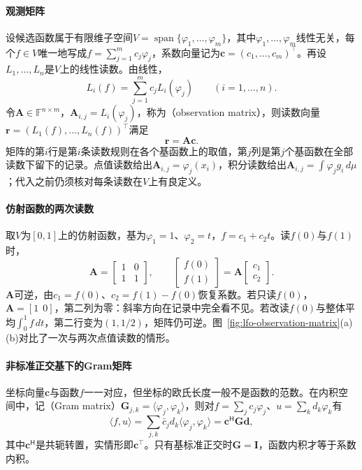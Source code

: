 \paragraph{观测矩阵}
设候选函数属于有限维子空间$V=\operatorname{span}\{\varphi_1,\ldots,\varphi_m\}$，其中$\varphi_1,\ldots,\varphi_m$线性无关，每个$f\in V$唯一地写成$f=\sum_{j=1}^mc_j\varphi_j$，系数向量记为$\bm c=(c_1,\ldots,c_m)^{\top}$。再设$L_1,\ldots,L_n$是$V$上的线性读数。由线性，
\[
 L_i(f)=\sum_{j=1}^mc_jL_i(\varphi_j)\qquad(i=1,\ldots,n).
\]
令$\bm A\in\mathbb F^{n\times m}$，$\bm A_{i,j}=L_i(\varphi_j)$，称为（observation matrix），则读数向量$\bm r=(L_1(f),\ldots,L_n(f))^{\top}$满足
\begin{equation}
 \bm r=\bm A\bm c .
 \label{eq:lfo-observation-matrix}
\end{equation}
矩阵的第$i$行是第$i$条读数规则在各个基函数上的取值，第$j$列是第$j$个基函数在全部读数下留下的记录。点值读数给出$\bm A_{i,j}=\varphi_j(x_i)$，积分读数给出$\bm A_{i,j}=\int\varphi_jg_i\,d\mu$；代入之前仍须核对每条读数在$V$上有良定义。

\paragraph{仿射函数的两次读数}
取$V$为$[0,1]$上的仿射函数，基为$\varphi_1=1$、$\varphi_2=t$，$f=c_1+c_2t$。读$f(0)$与$f(1)$时，
\[
 \bm A=\begin{bmatrix}1&0\\1&1\end{bmatrix},\qquad
 \begin{bmatrix}f(0)\\f(1)\end{bmatrix}=\bm A\begin{bmatrix}c_1\\c_2\end{bmatrix}.
\]
$\bm A$可逆，由$c_1=f(0)$、$c_2=f(1)-f(0)$恢复系数。若只读$f(0)$，$\bm A=[1\ \ 0]$，第二列为零：斜率方向在记录中完全看不见。若改读$f(0)$与整体平均$\int_0^1f\,dt$，第二行变为$(1,1/2)$，矩阵仍可逆。图~\ref{fig:lfo-observation-matrix}(a)(b)对比了一次与两次点值读数的情形。

\paragraph{非标准正交基下的Gram矩阵}
坐标向量$\bm c$与函数$f$一一对应，但坐标的欧氏长度一般不是函数的范数。在内积空间中，记（Gram matrix）$\bm G_{j,k}=\langle\varphi_j,\varphi_k\rangle$，则对$f=\sum_jc_j\varphi_j$、$u=\sum_kd_k\varphi_k$有
\[
 \langle f,u\rangle=\sum_{j,k}\bar c_jd_k\langle\varphi_j,\varphi_k\rangle=\bm c^{\mathsf H}\bm G\bm d ,
\]
其中$\bm c^{\mathsf H}$是共轭转置，实情形即$\bm c^{\top}$。只有基标准正交时$\bm G=\bm I$，函数内积才等于系数内积。


